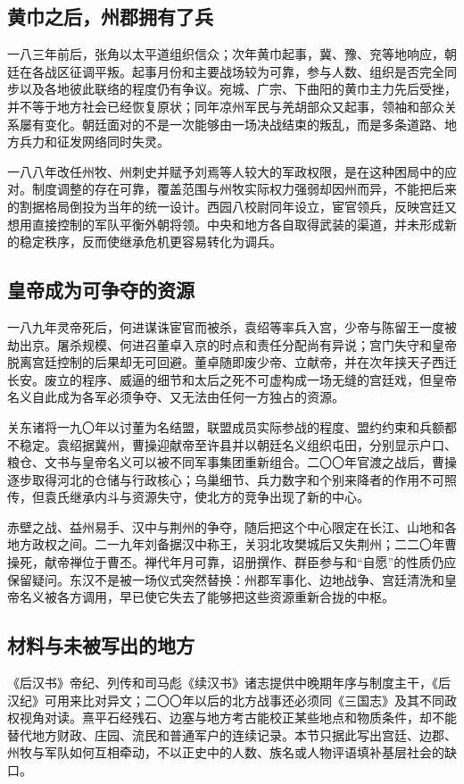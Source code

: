 \subsection{黄巾之后，州郡拥有了兵}

一八三年前后，张角以太平道组织信众；次年黄巾起事，冀、豫、兖等地响应，朝廷在各战区征调平叛。起事月份和主要战场较为可靠，参与人数、组织是否完全同步以及各地彼此联络的程度仍有争议。宛城、广宗、下曲阳的黄巾主力先后受挫，并不等于地方社会已经恢复原状；同年凉州军民与羌胡部众又起事，领袖和部众关系屡有变化。朝廷面对的不是一次能够由一场决战结束的叛乱，而是多条道路、地方兵力和征发网络同时失灵。

一八八年改任州牧、州刺史并赋予刘焉等人较大的军政权限，是在这种困局中的应对。制度调整的存在可靠，覆盖范围与州牧实际权力强弱却因州而异，不能把后来的割据格局倒投为当年的统一设计。西园八校尉同年设立，宦官领兵，反映宫廷又想用直接控制的军队平衡外朝将领。中央和地方各自取得武装的渠道，并未形成新的稳定秩序，反而使继承危机更容易转化为调兵。

\subsection{皇帝成为可争夺的资源}

一八九年灵帝死后，何进谋诛宦官而被杀，袁绍等率兵入宫，少帝与陈留王一度被劫出京。屠杀规模、何进召董卓入京的时点和责任分配尚有异说；宫门失守和皇帝脱离宫廷控制的后果却无可回避。董卓随即废少帝、立献帝，并在次年挟天子西迁长安。废立的程序、威逼的细节和太后之死不可虚构成一场无缝的宫廷戏，但皇帝名义自此成为各军必须争夺、又无法由任何一方独占的资源。

关东诸将一九〇年以讨董为名结盟，联盟成员实际参战的程度、盟约约束和兵额都不稳定。袁绍据冀州，曹操迎献帝至许县并以朝廷名义组织屯田，分别显示户口、粮仓、文书与皇帝名义可以被不同军事集团重新组合。二〇〇年官渡之战后，曹操逐步取得河北的仓储与行政核心；乌巢细节、兵力数字和个别来降者的作用不可照传，但袁氏继承内斗与资源失守，使北方的竞争出现了新的中心。

赤壁之战、益州易手、汉中与荆州的争夺，随后把这个中心限定在长江、山地和各地方政权之间。二一九年刘备据汉中称王，关羽北攻樊城后又失荆州；二二〇年曹操死，献帝禅位于曹丕。禅代年月可靠，诏册撰作、群臣参与和“自愿”的性质仍应保留疑问。东汉不是被一场仪式突然替换：州郡军事化、边地战争、宫廷清洗和皇帝名义被各方调用，早已使它失去了能够把这些资源重新合拢的中枢。

\subsection{材料与未被写出的地方}

《后汉书》帝纪、列传和司马彪《续汉书》诸志提供中晚期年序与制度主干，《后汉纪》可用来比对异文；二〇〇年以后的北方战事还必须同《三国志》及其不同政权视角对读。熹平石经残石、边塞与地方考古能校正某些地点和物质条件，却不能替代地方财政、庄园、流民和普通军户的连续记录。本节只据此写出宫廷、边郡、州牧与军队如何互相牵动，不以正史中的人数、族名或人物评语填补基层社会的缺口。
